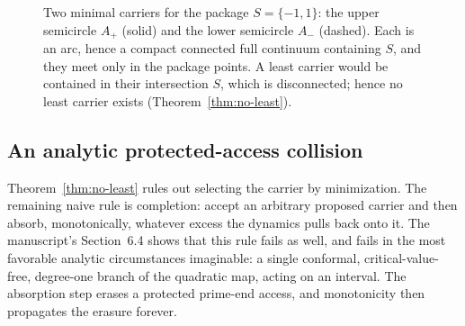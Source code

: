 \documentclass[11pt,reqno]{amsart}
\theoremstyle{definition}
\theoremstyle{remark}
\begin{document}
\begin{figure}[ht]
\centering
{}
\caption{Two minimal carriers for the package $S=\{-1,1\}$: the upper
semicircle $A_+$ (solid) and the lower semicircle $A_-$ (dashed). Each is an
arc, hence a compact connected full continuum containing $S$, and they meet
only in the package points. A least carrier would be contained in their
intersection $S$, which is disconnected; hence no least carrier exists
(Theorem~\ref{thm:no-least}).}
\label{fig:no-least}
\end{figure}

\subsection{An analytic protected-access collision}\label{subsec:B-collision}

Theorem~\ref{thm:no-least} rules out selecting the carrier by minimization.
The remaining naive rule is completion: accept an arbitrary proposed carrier
and then absorb, monotonically, whatever excess the dynamics pulls back onto
it. The manuscript's Section~6.4 shows that this rule fails as well, and
fails in the most favorable analytic circumstances imaginable: a single
conformal, critical-value-free, degree-one branch of the quadratic map,
acting on an interval. The absorption step erases a protected prime-end
access, and monotonicity then propagates the erasure forever.
\end{document}

